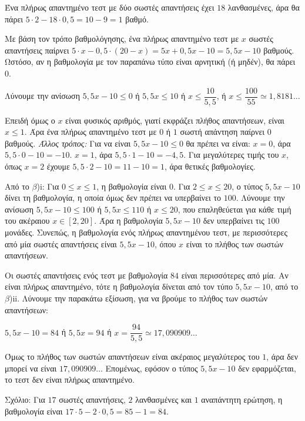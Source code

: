
\begin{alist}
\item Ένα πλήρως απαντημένο τεστ με δύο σωστές απαντήσεις έχει $18$ λανθασμένες, άρα θα
πάρει $5 \cdot 2 - 18 \cdot 0,5 = 10 - 9 = 1$ βαθμό.

\item
\begin{rlist}
\item Με βάση τον τρόπο βαθμολόγησης, ένα πλήρως απαντημένο τεστ με $x$ σωστές
απαντήσεις παίρνει $5 \cdot x - 0,5 \cdot (20 - x) = 5x + 0,5x - 10 = 5,5x - 10$ βαθμούς.
Ωστόσο, αν η βαθμολογία με τον παραπάνω τύπο είναι αρνητική (ή μηδέν), θα πάρει $0$.

Λύνουμε την ανίσωση $5,5x - 10 \le 0$ ή $5,5x \le 10$ ή $x \le \dfrac{10}{5,5}$, ή $x \le \dfrac{100}{55} \simeq 1,8181\dots$

Επειδή όμως ο $x$ είναι φυσικός αριθμός, γιατί εκφράζει πλήθος απαντήσεων, είναι
$x \le 1$.
Άρα ένα πλήρως απαντημένο τεστ με $0$ ή $1$ σωστή απάντηση παίρνει $0$ βαθμούς.
\textit{Άλλος τρόπος:}
Για να είναι $5,5x - 10 \le 0$ θα πρέπει να είναι:
$x = 0$, άρα $5,5 \cdot 0 - 10 = -10$.
$x = 1$, άρα $5,5 \cdot 1 - 10 = -4,5$.
Για μεγαλύτερες τιμής του $x$, όπως $x = 2$ έχουμε $5,5 \cdot 2 - 10 = 11 - 10 = 1$, άρα θετικές
βαθμολογίες.
\item Από το $\beta$)i:
Για $0 \le x \le 1$, η βαθμολογία είναι $0$.
Για $2 \le x \le 20$, ο τύπος $5,5x - 10$ δίνει τη βαθμολογία, η οποία όμως δεν πρέπει να
υπερβαίνει το $100$. Λύνουμε την ανίσωση $5,5x - 10 \le 100$ ή $5,5x \le 110$ ή $x \le 20$,
που επαληθεύεται για κάθε τιμή του ακέραιου $x \in [2, 20]$.
Άρα η βαθμολογία $5,5x - 10$ δεν υπερβαίνει τις $100$ μονάδες.
Συνεπώς, η βαθμολογία ενός πλήρως απαντημένου τεστ, με περισσότερες από μία
σωστές απαντήσεις είναι $5,5x - 10$, όπου $x$ είναι το πλήθος των σωστών απαντήσεων.
\item Οι σωστές απαντήσεις ενός τεστ με βαθμολογία $84$ είναι περισσότερες από μία.
Αν είναι πλήρως απαντημένο, τότε η βαθμολογία δίνεται από τον τύπο $5,5x - 10$, από
το $\beta$)ii. Λύνουμε την παρακάτω εξίσωση, για να βρούμε το πλήθος των σωστών
απαντήσεων:

$5,5x - 10 = 84$ ή $5,5x = 94$ ή $x = \dfrac{94}{5,5} \simeq 17,090909\dots$

Όμως το πλήθος των σωστών απαντήσεων είναι ακέραιος μεγαλύτερος του $1$, άρα δεν
μπορεί να είναι $17,090909\dots$
Επομένως, εφόσον ο τύπος $5,5x - 10$ δεν εφαρμόζεται, το τεστ δεν είναι πλήρως
απαντημένο.
\end{rlist}
Σχόλιο: Για $17$ σωστές απαντήσεις, $2$ λανθασμένες και $1$ αναπάντητη ερώτηση, η
βαθμολογία είναι $17 \cdot 5 - 2 \cdot 0,5 = 85 - 1 = 84$.
\end{alist}

